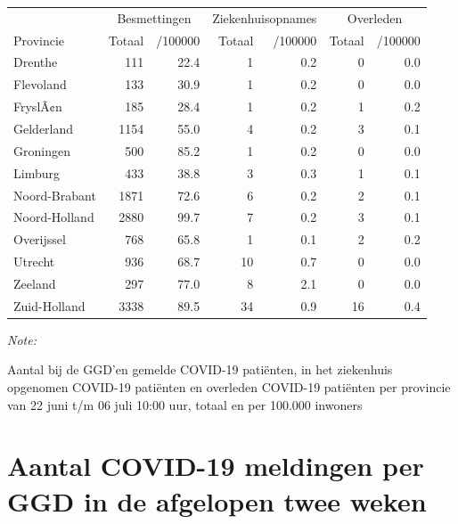 \documentclass[
  english,
  man,floatsintext]{apa6}
\begin{document}
\begin{table}
\centering
\begin{threeparttable}
\begin{tabular}{lrrrrrr}
\toprule
\multicolumn{1}{c}{ } & \multicolumn{2}{c}{Besmettingen} & \multicolumn{2}{c}{Ziekenhuisopnames} & \multicolumn{2}{c}{Overleden} \\
\cmidrule(l{3pt}r{3pt}){2-3} \cmidrule(l{3pt}r{3pt}){4-5} \cmidrule(l{3pt}r{3pt}){6-7}
Provincie & Totaal & /100000 & Totaal & /100000 & Totaal & /100000\\
\midrule
Drenthe & 111 & 22.4 & 1 & 0.2 & 0 & 0.0\\
Flevoland & 133 & 30.9 & 1 & 0.2 & 0 & 0.0\\
FryslÃ¢n & 185 & 28.4 & 1 & 0.2 & 1 & 0.2\\
Gelderland & 1154 & 55.0 & 4 & 0.2 & 3 & 0.1\\
Groningen & 500 & 85.2 & 1 & 0.2 & 0 & 0.0\\
Limburg & 433 & 38.8 & 3 & 0.3 & 1 & 0.1\\
Noord-Brabant & 1871 & 72.6 & 6 & 0.2 & 2 & 0.1\\
Noord-Holland & 2880 & 99.7 & 7 & 0.2 & 3 & 0.1\\
Overijssel & 768 & 65.8 & 1 & 0.1 & 2 & 0.2\\
Utrecht & 936 & 68.7 & 10 & 0.7 & 0 & 0.0\\
Zeeland & 297 & 77.0 & 8 & 2.1 & 0 & 0.0\\
Zuid-Holland & 3338 & 89.5 & 34 & 0.9 & 16 & 0.4\\
\bottomrule
\end{tabular}
\begin{tablenotes}
\item \textit{Note: } 
\item Aantal bij de GGD’en gemelde COVID-19 patiënten, in het ziekenhuis opgenomen COVID-19 patiënten en overleden COVID-19 patiënten per provincie van 22 juni t/m 06 juli 10:00 uur, totaal en per 100.000 inwoners
\end{tablenotes}
\end{threeparttable}
\end{table}

\newpage

\hypertarget{aantal-covid-19-meldingen-per-ggd-in-de-afgelopen-twee-weken}{%
\section{Aantal COVID-19 meldingen per GGD in de afgelopen twee weken}\label{aantal-covid-19-meldingen-per-ggd-in-de-afgelopen-twee-weken}}
\end{document}
